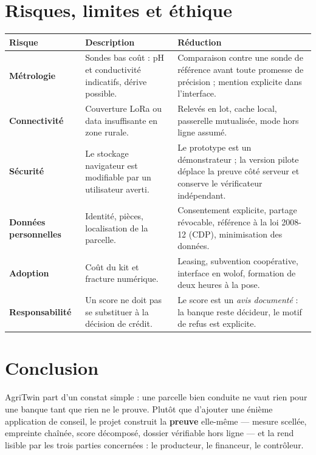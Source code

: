 \documentclass[12pt, a4paper]{article}
\begin{document}
\section{Risques, limites et éthique}

\begin{tabularx}{\linewidth}{>{\bfseries\color{primary}}p{3.4cm} X X}
  \toprule
  \rowcolor{lightbg}
  Risque & Description & Réduction \\
  \midrule
  Métrologie & Sondes bas coût : pH et conductivité indicatifs, dérive possible. & Comparaison contre une sonde de référence avant toute promesse de précision ; mention explicite dans l'interface. \\
  \addlinespace
  Connectivité & Couverture LoRa ou data insuffisante en zone rurale. & Relevés en lot, cache local, passerelle mutualisée, mode hors ligne assumé. \\
  \addlinespace
  Sécurité & Le stockage navigateur est modifiable par un utilisateur averti. & Le prototype est un démonstrateur ; la version pilote déplace la preuve côté serveur et conserve le vérificateur indépendant. \\
  \addlinespace
  Données personnelles & Identité, pièces, localisation de la parcelle. & Consentement explicite, partage révocable, référence à la loi 2008-12 (CDP), minimisation des données. \\
  \addlinespace
  Adoption & Coût du kit et fracture numérique. & Leasing, subvention coopérative, interface en wolof, formation de deux heures à la pose. \\
  \addlinespace
  Responsabilité & Un score ne doit pas se substituer à la décision de crédit. & Le score est un \emph{avis documenté} : la banque reste décideur, le motif de refus est explicite. \\
  \bottomrule
\end{tabularx}

\section{Conclusion}

AgriTwin part d'un constat simple : une parcelle bien conduite ne vaut rien pour une banque
tant que rien ne le prouve. Plutôt que d'ajouter une énième application de conseil, le
projet construit la \textbf{preuve} elle-même — mesure scellée, empreinte chaînée, score
décomposé, dossier vérifiable hors ligne — et la rend lisible par les trois parties
concernées : le producteur, le financeur, le contrôleur.
\end{document}
